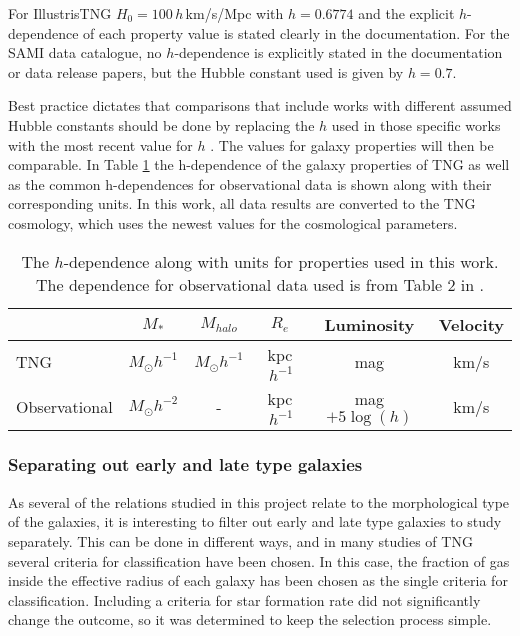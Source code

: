 For IllustrisTNG $H_0=100\,h\,$km/s/Mpc with $h=0.6774$ and the explicit $h$-dependence of each property value is stated clearly in the documentation. For the SAMI data catalogue, no $h$-dependence is explicitly stated in the documentation or data release papers, but the Hubble constant used is given by $h = 0.7$.

Best practice dictates that comparisons that include works with different assumed Hubble constants should be done by replacing the $h$ used in those specific works with the most recent value for $h$ \parencite{Croton2013}. The values for galaxy properties will then be comparable. In Table \ref{h_dependence} the h-dependence of the galaxy properties of TNG as well as the common h-dependences for observational data is shown along with their corresponding units. In this work, all data results are converted to the TNG cosmology, which uses the newest values for the cosmological parameters.

\begin{table}
\begin{center}
\caption{The $h$-dependence along with units for properties used in this work. The dependence for observational data used is from Table 2 in \cite{Croton2013}.}
\label{h_dependence}
\begin{tabular}{ l| c c c c c } 
 \hline
 \hline
   & $M_*$ & $M_{halo}$ & $R_e$ & Luminosity & Velocity \\
 \hline
 TNG & $M_{\odot}h^{-1}$ & $M_{\odot}h^{-1}$ & kpc$\,h^{-1}$ & mag & km/s \\ 
 Observational & $M_{\odot}h^{-2}$ & - & kpc$\,h^{-1}$ & mag $+5\log(h)$ & km/s \\
 \hline 
\end{tabular}
\end{center}
\end{table}

\subsubsection{Separating out early and late type galaxies}
As several of the relations studied in this project relate to the morphological type of the galaxies, it is interesting to filter out early and late type galaxies to study separately. This can be done in different ways, and in many studies of TNG several criteria for classification have been chosen. In this case, the fraction of gas inside the effective radius of each galaxy has been chosen as the single criteria for classification. Including a criteria for star formation rate did not significantly change the outcome, so it was determined to keep the selection process simple.


